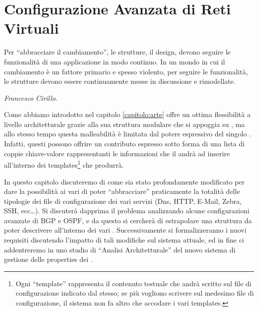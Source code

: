 \chapter{Configurazione Avanzata di Reti Virtuali}\label{capitolo:evoluzione_visualnetkit}

\begin{flushright}
\begin{footnotesize}
Per ``abbracciare il cambiamento'', le strutture, il design, devono seguire le funzionalità di una applicazione in modo continuo. In un mondo in cui il cambiamento è un fattore primario e spesso violento, per seguire le funzionalità, le strutture devono essere continuamente messe in discussione e rimodellate.\\
\end{footnotesize}
\begin{footnotesize}
\textit{Francesco Cirillo}.
\end{footnotesize}
\end{flushright}

Come abbiamo introdotto nel capitolo \ref{capitolo:arte} \visualnetkit{} offre un ottima flessibilità a livello architetturale grazie alla sua struttura modulare che si appoggia su \plugin{}, ma allo stesso tempo questa malleabilità è limitata dal potere espressivo del singolo \plugin{}. Infatti, questi possono offrire un contributo espresso sotto forma di una lista di coppie chiave-valore rappresentanti le informazioni che il \plugin{} andrà ad inserire all'interno dei templates\footnote{Ogni ``template'' rappresenta il contenuto testuale che andrà scritto sul file di configurazione indicato dal \plugin{} stesso; se più \plugin{} vogliono scrivere sul medesimo file di configurazione, il sistema non fa altro che accodare i vari templates.} che produrrà.

In questo capitolo discuteremo di come \visualnetkit{} sia stato profondamente modificato per dare la possibilità ai vari \plugin{} di poter ``abbracciare'' praticamente la totalità delle tipologie dei file di configurazione dei vari servizi (Dns, HTTP, E-Mail, Zebra, SSH, ecc\ldots). Si discuterà dapprima il problema analizzando alcune configurazioni avanzate di BGP e OSPF, e da questo si cercherà di estrapolare una struttura da poter descrivere all'interno dei vari \plugin{}. Successivamente si formalizzeranno i nuovi requisiti discutendo l'impatto di tali modifiche sul sistema attuale, ed in fine ci addentreremo in uno studio di ``Analisi Architetturale'' del nuovo sistema di gestione delle properties dei \plugin{}.

